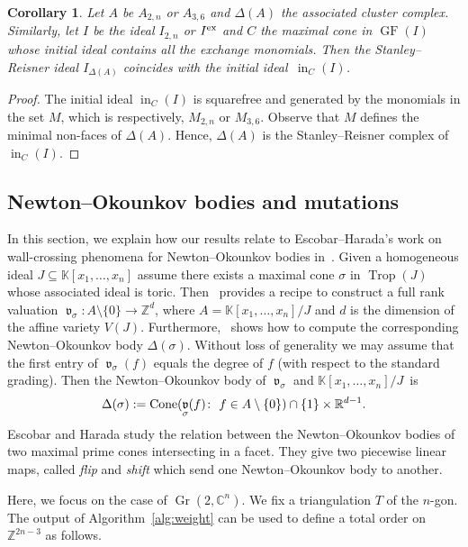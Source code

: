 \documentclass[pdftex]{sigma}%
\newtheorem{Corollary}[Theorem]{Corollary}
\numberwithin{equation}{section}
\DeclareMathOperator{\init}{in}
\DeclareMathOperator{\Gr}{Gr}
\DeclareMathOperator{\GF}{GF}
\DeclareMathOperator{\trop}{Trop}
\DeclareMathOperator{\val}{\mathfrak v}
\begin{document}
\begin{Corollary}
Let $A$ be $A_{2,n}$ or $A_{3,6}$ and $\Delta(A)$ the associated cluster complex.
Similarly, let $I$ be the ideal $I_{2,n}$ or $I^{\rm ex}$ and $C$ the maximal cone in $\GF(I)$ whose initial ideal contains all the exchange monomials.
Then the Stanley--Reisner ideal $I_{\Delta(A)}$ coincides with the initial ideal~$\init_C(I)$.
\end{Corollary}
\begin{proof}
The initial ideal $\init_C(I)$ is squarefree and generated by the monomials in the set $M$, which is respectively, $M_{2,n}$ or $M_{3,6}$.
Observe that $M$ defines the minimal non-faces of $\Delta(A)$.
Hence, $\Delta(A)$ is the Stanley--Reisner complex of $\init_C(I)$.
\end{proof}


\subsection{Newton--Okounkov bodies and mutations}\label{sec:NO}

In this section, we explain how our results relate to Escobar--Harada's work on wall-crossing phenomena for Newton--Okounkov bodies in~\cite{EH-NObodies}.
Given a homogeneous ideal $J\subseteq \mathbb K[x_1,\dots,x_n]$ assume there exists a maximal cone $\sigma$ in $\trop(J)$ whose associated ideal is toric.
Then~\cite[Section~4]{KM16} provides a recipe to construct a full rank valuation $\val_\sigma\colon A\setminus \{0\}\to \mathbb Z^{d}$, where $A=\mathbb K[x_1,\dots,x_n]/J$ and $d$ is the dimension of the affine variety $V(J)$.
Furthermore,~\cite[Corollary~4.7]{KM16} shows how to compute the corresponding Newton--Okounkov body $\Delta(\sigma)$. Without loss of generality we may assume that the first entry of $\val_\sigma(f)$ equals the degree of $f$ (with respect to the standard grading). Then the Newton--Okounkov body of $\val_\sigma$ and $\mathbb K[x_1,\dots,x_n]/J$~is
\begin{displaymath}
\Delta(\sigma):={\rm Cone}(\val_\sigma(f)\colon \ f\in A\setminus \{0\}) \cap \{1\}\times \mathbb R^{d-1}.
\end{displaymath}
Escobar and Harada study the relation between the Newton--Okounkov bodies of two maximal prime cones intersecting in a facet.
They give two piecewise linear maps, called {\it flip} and {\it shift} which send one Newton--Okounkov body to another.


Here, we focus on the case of $\Gr(2,\mathbb C^n)$.
We fix a triangulation $T$ of the $n$-gon.
The output of Algorithm~\ref{alg:weight} can be used to define a total order on $\mathbb Z^{2n-3}$ as follows.
\end{document}
